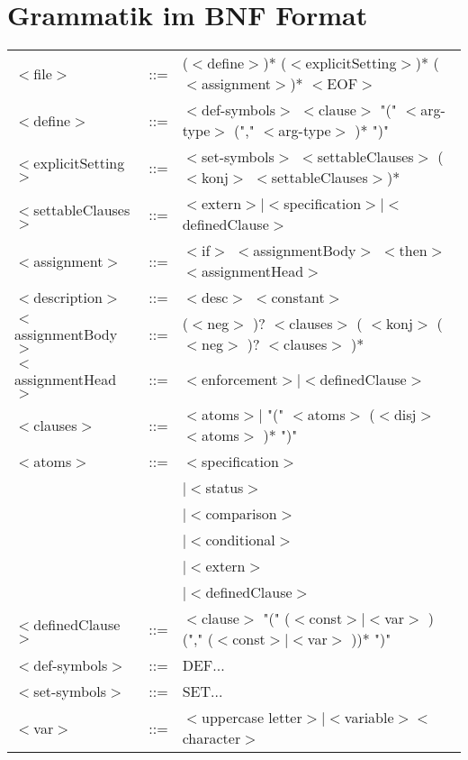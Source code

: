 
\chapter{Grammatik im BNF Format} %

\label{Grammatik} %



\begin{tabular}{lll}
$<$file$>$ 		&::=& ($<$define$>$)* ($<$explicitSetting$>$)* ($<$assignment$>$)*  $<$EOF$>$\\
$<$define$>$ 		&::=& $<$def-symbols$>$ $<$clause$>$ "(" $<$arg-type$>$ ("," $<$arg-type$>$ )* ")" \\
$<$explicitSetting$>$ 	&::=& $<$set-symbols$>$ $<$settableClauses$>$ ($<$konj$>$ $<$settableClauses$>$)* \\
$<$settableClauses$>$	&::=& $<$extern$>|<$specification$>|<$definedClause$>$ \\
$<$assignment$>$ 	&::=& $<$if$>$ $<$assignmentBody$>$ $<$then$>$ $<$assignmentHead$>$ \\
$<$description$>$ 	&::=& $<$desc$>$  $<$constant$>$ \\
$<$assignmentBody$>$  	&::=& ($<$neg$>$ )? $<$clauses$>$  ( $<$konj$>$  ($<$neg$>$ )? $<$clauses$>$ )* \\
$<$assignmentHead$>$ 	&::=& $<$enforcement$>|<$definedClause$>$\\
$<$clauses$>$ 		&::=& $<$atoms$>|$ "(" $<$atoms$>$  ($<$disj$>$  $<$atoms$>$ )* ")"\\
$<$atoms$>$ 		&::=& $<$specification$>$ 	\\	
			&&	$| <$status$>$ \\
			&&	$| <$comparison$>$ \\
			&&	$| <$conditional$>$ \\
			&&	$| <$extern$>$ \\
			&&	$| <$definedClause$>$ \\
$<$definedClause$>$ 	&::=& $<$clause$>$  "(" ($<$const$>|<$var$>$ ) ("," ($<$const$>|<$var$>$ ))* ")"\\
\hline
$<$def-symbols$>$ 	&::=& DEF...\\
$<$set-symbols$>$ 	&::=& SET...\\
\hline
$<$var$>$ 		&::=& $<$uppercase letter$> | <$variable$> <$character$>$\\

\end{tabular}
